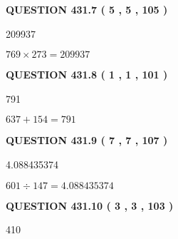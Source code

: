 \documentclass{ctexart}
\begin{document}
\vspace{0.2in}
  
{\textbf{\Large{QUESTION
431.7 
 ( 5 , 5 , 105 )
}}}
  
  
 
 
\noindent{}

209937
 
 
 
 
\noindent{}

$ %
769 \times  %
273=   %
209937$
 
 
  
\vspace{0.2in}
  
{\textbf{\Large{QUESTION
431.8 
 ( 1 , 1 , 101 )
}}}
  
  
 
 
\noindent{}

791
 
 
 
 
\noindent{}

$ %
637 +  %
154=   %
791$
 
 
  
\vspace{0.2in}
  
{\textbf{\Large{QUESTION
431.9 
 ( 7 , 7 , 107 )
}}}
  
  
 
 
\noindent{}

4.088435374
 
 
 
 
\noindent{}

$ %
601 \div  %
147=   %
4.088435374$
 
 
  
\vspace{0.2in}
  
{\textbf{\Large{QUESTION
431.10 
 ( 3 , 3 , 103 )
}}}
  
  
 
 
\noindent{}

410
 
 
 
\end{document}
